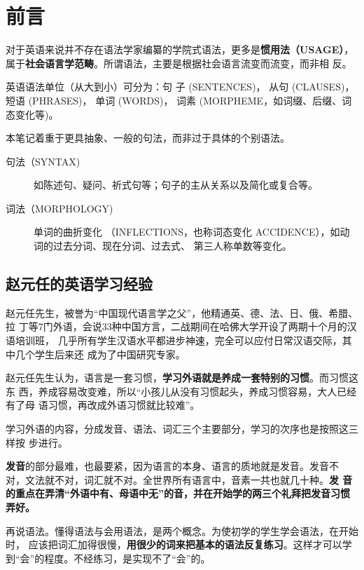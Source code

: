 \chapter{前言}

对于英语来说并不存在语法学家编纂的学院式语法，更多是\textbf{惯用法（USAGE）}，
属于\textbf{社会语言学范畴}。所谓语法，主要是根据社会语言流变而流变，而非相
反。

英语语法单位（从大到小）可分为：句
子 (SENTENCES)， 从句 (CLAUSES)， 短语 (PHRASES)， 单词 (WORDS)， 词素
(MORPHEME，如词缀、后缀、词态变化等)。

本笔记着重于更具抽象、一般的句法，而非过于具体的个别语法。

\begin{description}
\item [句法（SYNTAX)] 如陈述句、疑问、祈式句等；句子的主从关系以及简化或复合等。
\item [词法（MORPHOLOGY)] 单词的曲折变化
  （INFLECTIONS，也称词态变化 ACCIDENCE），如动词的过去分词、现在分词、过去式、
  第三人称单数等变化。
\end{description}

\section{赵元任的英语学习经验}

赵元任先生，被誉为“中国现代语言学之父”，他精通英、德、法、日、俄、希腊、拉
丁等7门外语，会说33种中国方言，二战期间在哈佛大学开设了两期十个月的汉语培训班，
几乎所有学生汉语水平都进步神速，完全可以应付日常汉语交际，其中几个学生后来还
成为了中国研究专家。

赵元任先生认为，语言是一套习惯，\textbf{学习外语就是养成一套特别的习惯}。而习惯这东
西，养成容易改变难，所以“小孩儿从没有习惯起头，养成习惯容易，大人已经有了母
语习惯，再改成外语习惯就比较难”。

学习外语的内容，分成发音、语法、词汇三个主要部分，学习的次序也是按照这三样按
步进行。

\textbf{发音}的部分最难，也最要紧，因为语言的本身、语言的质地就是发音。发音不
对，文法就不对，词汇就不对。全世界所有语言中，音素一共也就几十种。\textbf{发
  音的重点在弄清“外语中有、母语中无”的音，并在开始学的两三个礼拜把发音习惯
  弄好。}

再说语法。懂得语法与会用语法，是两个概念。为使初学的学生学会语法，在开始时，
应该把词汇加得很慢，\textbf{用很少的词来把基本的语法反复练习}。这样才可以学
到“会”的程度。不经练习，是实现不了“会”的。

